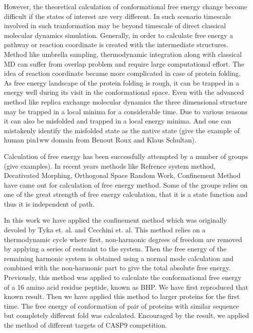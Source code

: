 \documentclass[12pt]{article}
\begin{document}
However, the theoretical calculation of conformational free energy change become difficult if the states of interest are very 
different. In such scenario timescale involved in such tranformation may be beyond timescale of
direct classical molecular dynamics simulation.  Generally, in order to calculate free energy a pathway or reaction coordinate is created with
the intermediate structures. Method like umbrella sampling, thermodynamic integration along with classical MD can suffer from overlap problem
and require large computational effort. The idea of reaction coordinate became more complicated in case of protein folding. 
As free energy landscape of the protein folding is rough, it can be trapped in a energy well during its visit in the conformational 
space. Even with the advanced method like replica exchange molecular dynamics the three dimensional structure may be trapped in a 
local minima for a considerable time. Due to various reasons it can also be misfolded and trapped
in a local energy minima. And one can mistakenly identify the misfolded state as the native state (give the example of human pin1ww domain
from Benout Roux and Klaus Schultan). 


Calculation of free energy has been successfully attempted by a number of groups (give examples). In recent years methods like 
Refrence system method, Decativated Morphing, Orthogonal Space Random Work, Confinement Method have came out for calculation of 
free energy method. Some of the groups  relies on one of the 
great strength of free energy calculation, that it is a state function and thus it is independent of path.  

In this work we have applied the confinement method which was originally devoled by Tyka et. al. and Cecchini et. al.
This method relies on a thermodynamic cycle where first, non-harmonic degrees of freedom are removed by applying a
series of restraint to the system. Then the free energy of the remaining harmonic system is obtained using a normal mode 
calculation and combined with the non-harmonic part to give the total absolute free energy. 
Previously, this method was applied to calculate the conformational free energy of a 16 amino acid residue peptide, known as BHP. 
We have first reproduced that known result. Then we have applied this method to larger proteins for the first time. The free energy 
of conformation of pair of proteins with similar sequence but completely different fold was calculated. Encouraged by the result, 
we applied the method of different targets of CASP9 competition.  
\end{document}
